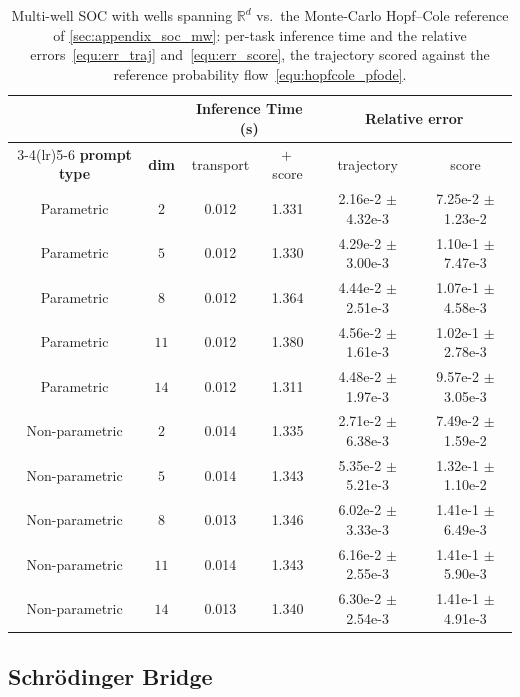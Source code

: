 \documentclass[preprint]{elsarticle}
\newcommand{\R}{\mathbb{R}}
\begin{document}
\begin{table}[!htpb]
    \centering
    \caption{Multi-well SOC with wells spanning $\R^d$ vs.\ the Monte-Carlo
    Hopf--Cole reference of \ref{sec:appendix_soc_mw}: per-task inference time
    and the relative errors~\eqref{equ:err_traj} and~\eqref{equ:err_score}, the
    trajectory scored against the reference probability
    flow~\eqref{equ:hopfcole_pfode}. }
    \label{tab:mwsoc_error}
    \begin{tabular}{cccccc}
        \toprule
         &  & \multicolumn{2}{c}{\textbf{Inference Time (s)}}
            & \multicolumn{2}{c}{\textbf{Relative error}} \\
        \cmidrule(lr){3-4}\cmidrule(lr){5-6}
        \textbf{prompt type} & \textbf{dim} & transport & $+$\,score
            & trajectory & score \\
        \midrule
        Parametric & $2$ & 0.012 & 1.331 & 2.16e-2 $\pm$ 4.32e-3 & 7.25e-2 $\pm$ 1.23e-2 \\
        Parametric & $5$ & 0.012 & 1.330 & 4.29e-2 $\pm$ 3.00e-3 & 1.10e-1 $\pm$ 7.47e-3 \\
        Parametric & $8$ & 0.012 & 1.364 & 4.44e-2 $\pm$ 2.51e-3 & 1.07e-1 $\pm$ 4.58e-3 \\
        Parametric & $11$ & 0.012 & 1.380 & 4.56e-2 $\pm$ 1.61e-3 & 1.02e-1 $\pm$ 2.78e-3 \\
        Parametric & $14$ & 0.012 & 1.311 & 4.48e-2 $\pm$ 1.97e-3 & 9.57e-2 $\pm$ 3.05e-3 \\
        \midrule
        Non-parametric & $2$ & 0.014 & 1.335 & 2.71e-2 $\pm$ 6.38e-3 & 7.49e-2 $\pm$ 1.59e-2 \\
        Non-parametric & $5$ & 0.014 & 1.343 & 5.35e-2 $\pm$ 5.21e-3 & 1.32e-1 $\pm$ 1.10e-2 \\
        Non-parametric & $8$ & 0.013 & 1.346 & 6.02e-2 $\pm$ 3.33e-3 & 1.41e-1 $\pm$ 6.49e-3 \\
        Non-parametric & $11$ & 0.014 & 1.343 & 6.16e-2 $\pm$ 2.55e-3 & 1.41e-1 $\pm$ 5.90e-3 \\
        Non-parametric & $14$ & 0.013 & 1.340 & 6.30e-2 $\pm$ 2.54e-3 & 1.41e-1 $\pm$ 4.91e-3 \\
        \bottomrule
    \end{tabular}
\end{table}

\subsection{Schr\"odinger Bridge}
\label{sec:exp_sb}
\end{document}
